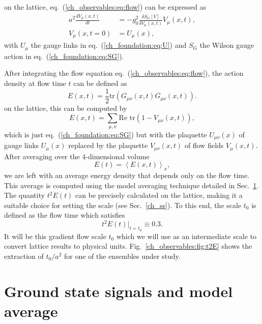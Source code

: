 on the lattice, eq.~(\ref{ch_observables:eq:flow}) can be expressed as 
\begin{align}
a^2\frac{dV_{\mu}(x,t)}{dt}&=-g_0^2\frac{\delta S_{\textrm{G}}[V]}{\delta V_{\mu}(x,t)}V_{\mu}(x,t),\\
V_{\mu}(x,t=0)&=U_{\mu}(x),
\end{align}
with $U_{\mu}$ the gauge links in eq.~(\ref{ch_foundation:eq:U}) and $S_{\textrm{G}}$ the Wilson gauge action in eq.~(\ref{ch_foundation:eq:SG}).

After integrating the flow equation eq.~(\ref{ch_observables:eq:flow}), the action density at flow time $t$ can be defined as
\begin{equation}
E(x,t)=\frac{1}{2}{\textrm{tr}}\left({G}_{\mu\nu}(x,t){G}_{\mu\nu}(x,t)\right).
\end{equation}
on the lattice, this can be computed by
\begin{equation}
\label{ch_observables:eq:E}
E(x,t)=\sum_{\mu,\nu}\textrm{Re tr}\left(1-V_{\mu\nu}(x,t)\right),
\end{equation}
which is just eq.~(\ref{ch_foundation:eq:SG}) but with the plaquette $U_{\mu\nu}(x)$ of gauge links $U_{\mu}(x)$ replaced by the plaquette $V_{\mu\nu}(x,t)$ of flow fields $V_{\mu}(x,t)$. After averaging over the 4-dimensional volume
\begin{equation}
E(t)=\left<E(x,t)\right>_x,
\end{equation}
we are left with an average energy density that depends only on the flow time. This average is computed using the model averaging technique detailed in Sec.~\ref{ch_observables:sec:MA}. The quantity $t^2E(t)$ can be precisely calculated on the lattice, making it a suitable choice for setting the scale (see Sec.~\ref{ch_ss}). To this end, the scale $t_0$ is defined as the flow time which satisfies
\begin{equation}
\label{ch_observables:eq:t0}
t^2E(t)|_{t=t_0}\equiv0.3.
\end{equation}
It will be this gradient flow scale $t_0$ which we will use as an intermediate scale to convert lattice results to physical units. Fig.~\ref{ch_observables:fig:t2E} shows the extraction of $t_0/a^2$ for one of the ensembles under study.



\section{Ground state signals and model average}
\label{ch_observables:sec:MA}

